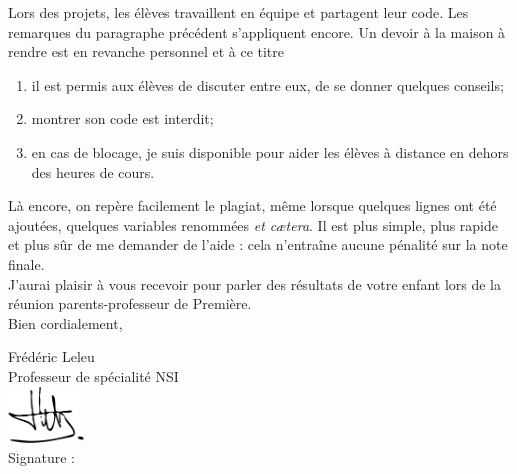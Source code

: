 \documentclass[a4paper,12pt,french]{article}
\begin{document}
Lors des projets, les élèves travaillent en équipe et partagent leur code. Les remarques du paragraphe précédent s'appliquent encore.
Un devoir à la maison à rendre est en revanche personnel et à ce titre

\begin{enumerate}[--]
	\item 	il est permis aux élèves de discuter entre eux, de se donner quelques conseils;
	\item 	montrer son code est interdit;
	\item   en cas de blocage, je suis disponible pour aider les élèves à distance en dehors des heures de cours.
\end{enumerate}
Là encore, on repère facilement le plagiat, même lorsque quelques lignes ont été ajoutées, quelques variables renommées \textit{et c\ae tera}. Il est plus simple, plus rapide et plus sûr de me demander de l'aide : cela n'entraîne aucune pénalité sur la note finale.\\


J'aurai plaisir à vous recevoir pour parler des résultats de votre enfant lors de la réunion parents-professeur de Première.\\


Bien cordialement,

\flushright Frédéric Leleu \\
Professeur de spécialité NSI\\

\includegraphics[width=2cm]{signature}\\
\flushleft
Signature :
\end{document}
